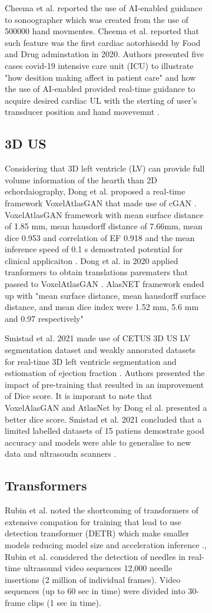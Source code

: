 \begin{figure}[H]
\begin{figure}[H]
Cheema et al. reported the use of AI-enabled guidance to sonoographer which was created from the use of 500000 hand movmentes.
Cheema et al.  reported that such feature was the first cardiac aotorhisedd by Food and Drug adminstation in 2020. 
Authors presented five cases covid-19 intensive care unit (ICU) to illustrate "how desition making affect in patient care" and how the use of AI-enabled provided real-time guidance to acquire desired cardiac UL with the sterting of user's transducer position and hand movevemnt \cite{CHEEMA2021JACCCaseReports}.



\subsection{3D US}
Considering that 3D left ventricle (LV) can provide full volume information of the hearth than 2D echordaiography,  Dong et al. proposed a real-time framework VoxelAtlasGAN that made use of cGAN \cite{dong2018-MICCAI}. 
VoxelAtlasGAN framework with mean surface distance of 1.85 mm, mean hausdorff distance of 7.66mm, mean dice 0.953 and correlation of EF 0.918 and the mean inference speed of 0.1 s demostrated potential for clinical applicaiton \cite{dong2018-MICCAI}.
Dong et al. in 2020 applied tranformers to obtain translations parematers that passed to VoxelAtlasGAN \cite{dong2020-MIA}.
AlasNET framework  ended up with "mean surface distance, mean hausdorff surface distance, and mean dice index were 1.52 mm, 5.6 mm and 0.97 respectively" \cite{dong2020-MIA}

Smistad et al. 2021 made use of CETUS 3D US LV segmentation dataset and weakly annorated datasets for real-time 3D left ventricle segmentation and estiomation of ejection fraction \cite{smistad2021-D-IUS}.
Authors presented the impact of pre-training that resulted in an improvement of Dice score. 
It is imporant to note that VoxelAlasGAN and AtlasNet by Dong el al. presented a better dice score.
Smistad et al. 2021 concluded that a limited labelled datasets of 15 patiens demostrate good accuracy and models were able to generalise to new data and ultrasoudn scanners \cite{smistad2021-D-IUS}.




\subsection{Transformers}

Rubin et al. noted the shortcoming of transformers of extensive compation for training that lead to use detection transformer (DETR) which make smaller models reducing model size and acceleration inference \cite{rubin2021-PMLH}.,
Rubin et al. considered the detection of needles in real-time ultrasound video sequences 12,000 needle insertions (2 million of individual frames).
Video sequences (up to 60 sec in time) were divided into 30-frame clips (1 sec in time).



\end{figure}
\end{figure}
